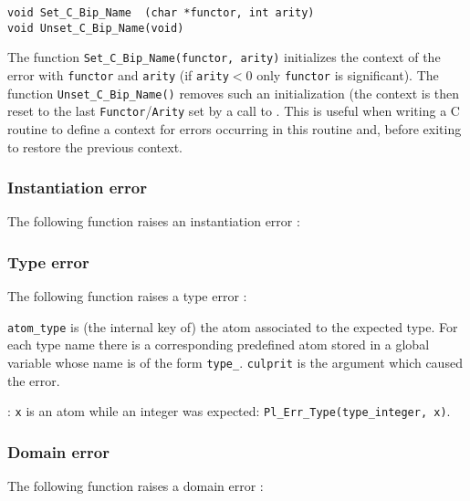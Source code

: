 \begin{Indentation}
\begin{verbatim}
void Set_C_Bip_Name  (char *functor, int arity)
void Unset_C_Bip_Name(void)
\end{verbatim}
\end{Indentation}

The function \texttt{Set\_C\_Bip\_Name(functor, arity)} initializes the
context of the error with \texttt{functor} and \texttt{arity} (if
\texttt{arity}$<$0 only \texttt{functor} is significant). The function
\texttt{Unset\_C\_Bip\_Name()} removes such an initialization (the context
is then reset to the last \texttt{Functor}/\texttt{Arity} set by a call to
 . This is useful when
writing a C routine to define a context for errors occurring in this routine
and, before exiting to restore the previous context.

\subsubsection{Instantiation error}
The following function raises an instantiation error :


\subsubsection{Type error}
The following function raises a type error :


\texttt{atom\_type} is (the internal key of) the atom associated to the
expected type. For each type name  there is a
corresponding predefined atom stored in a global variable whose name is of
the form \texttt{type\_}. \texttt{culprit} is the argument which
caused the error.

: \texttt{x} is an atom while an integer was expected:
\texttt{Pl\_Err\_Type(type\_integer, x)}.

\subsubsection{Domain error}
The following function raises a domain error :


